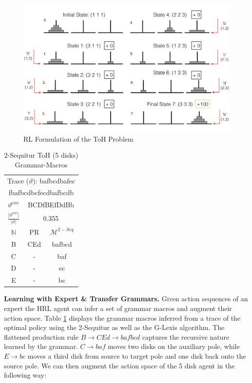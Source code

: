 \documentclass[10pt,letterpaper]{article}
\begin{document}
\begin{figure}
    \centering
    \includegraphics[width=\linewidth]{figures/hanoi_problem.png}
    \caption{RL Formulation of the ToH Problem}
    \label{fig:hanoi}
 \end{figure}
 

  \begin{table}
    \centering
    \begin{tabular}{c | c c |} %
\hline\hline %
 \multicolumn{3}{c}{Trace ($\vartheta$): bafbcdbafec} \\
 \multicolumn{3}{c}{fbafbcdbcfecdbafbcdb}\\
\hline
\hline
 $\vartheta^{enc}$ & \multicolumn{2}{c}{BCDfBEfDdBb} \\
 $\frac{|\vartheta^{enc}|}{|\vartheta|}$ & \multicolumn{2}{c}{0.355}\\
\hline \hline
$\mathbb{N}$ & PR & $\mathcal{M}^{2-Seq}$ \\ %
\hline %
B & CEd & bafbcd \\
C & - & baf \\
D & - & ec\\
E & - & bc\\ 
\hline %
\end{tabular}
      \caption{2-Sequitur ToH (5 disks) Grammar-Macros}
      \label{table:optimal_grammar}
\end{table}
  

\textbf{Learning with Expert \& Transfer Grammars.} Given action sequences of an expert the HRL agent can infer a set of grammar macros and augment their action space. Table \ref{table:optimal_grammar} displays the grammar macros inferred from a trace of the optimal policy using the 2-Sequitur as well as the G-Lexis algorithm. The flattened production rule $B \to CEd \to bafbcd$ captures the recursive nature learned by the grammar. $C \to baf$ moves two disks on the auxiliary pole, while $E \to bc$ moves a third disk from source to target pole and one disk back onto the source pole. We can then augment the action space of the 5 disk agent in the following way:
\end{document}
